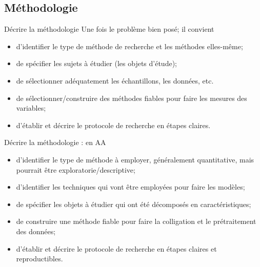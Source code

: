 \documentclass[french]{beamer}
\begin{document}
\subsection{Méthodologie}
\begin{frame}{Décrire la méthodologie}
Une fois le problème bien posé; il convient
	\begin{itemize}
		\item d’identifier le type de méthode de recherche et les méthodes elles-même; 
		\item de spécifier les sujets à étudier (les objets d’étude);
		\item de sélectionner adéquatement les échantillons, les données, etc.
		\item de sélectionner/construire des méthodes fiables pour faire les mesures des variables;
		\item d'établir et décrire le protocole de recherche en étapes claires.
	\end{itemize}
\end{frame}

\begin{frame}{Décrire la méthodologie : en AA}
\begin{itemize}
	\item d’identifier le type de méthode à employer, généralement  quantitative, mais pourrait être exploratorie/descriptive;
	\item d'identifier les techniques qui vont être employées pour faire les modèles;
	\item de spécifier les objets à étudier qui ont été décomposés en caractéristiques;
	\item de construire une méthode fiable pour faire la colligation et le prétraitement des données;
	\item d'établir et décrire le protocole de recherche en étapes claires et reproductibles.
\end{itemize}
\end{frame}
\end{document}
